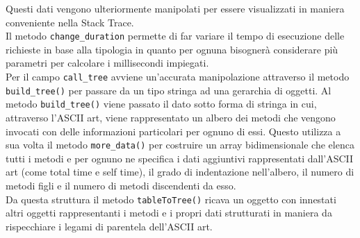 	Questi dati vengono ulteriormente manipolati per essere visualizzati in maniera conveniente nella Stack Trace.  \\
	Il metodo \texttt{change\_duration} permette di far variare il tempo di esecuzione delle richieste in base alla tipologia in quanto per ognuna bisognerà considerare più parametri per calcolare i millisecondi impiegati.\\
	Per il campo \texttt{call\_tree} avviene un'accurata manipolazione attraverso il metodo \texttt{build\_tree()} per passare da un tipo stringa ad una gerarchia di oggetti.
	 Al metodo \texttt{build\_tree()} viene passato il dato sotto forma di stringa in cui, attraverso l'ASCII art, viene rappresentato un albero dei metodi che vengono invocati con delle informazioni particolari per ognuno di essi. Questo utilizza a sua volta il metodo \texttt{more\_data()} per costruire un array bidimensionale che elenca tutti i metodi e per ognuno ne specifica i dati aggiuntivi rappresentati dall'ASCII art (come total time e self time), il grado di indentazione nell'albero, il numero di metodi figli e il numero di metodi discendenti da esso. \\ Da questa struttura il metodo \texttt{tableToTree()} ricava un oggetto con innestati altri oggetti rappresentanti i metodi e i propri dati strutturati in maniera da rispecchiare i legami di parentela dell'ASCII art.


